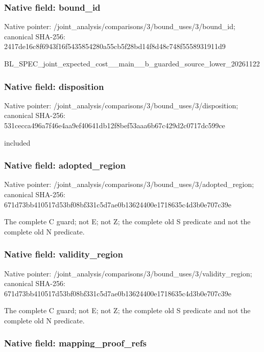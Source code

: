 \documentclass[10pt,a4paper]{article}
\begin{document}
\subsubsection{Native field: bound\_id}


Native pointer: /joint\_analysis/comparis\allowbreak{}ons/3/bound\_uses/3/bound\allowbreak{}\_id; canonical SHA-256: 2417de16c8f6943f16f54358\allowbreak{}54280a55cb5f28bd14f8d48c\allowbreak{}748f5558931911d9


BL\_SPEC\_joint\_expected\_c\allowbreak{}ost\_\_main\_\_b\_guarded\_sou\allowbreak{}rce\_lower\_20261122


\subsubsection{Native field: disposition}


Native pointer: /joint\_analysis/comparis\allowbreak{}ons/3/bound\_uses/3/dispo\allowbreak{}sition; canonical SHA-256: 531cecca496a7f46e4aa9ef4\allowbreak{}0641db12f8bef53aaa6b67c4\allowbreak{}29d2c0717dc599ce


included


\subsubsection{Native field: adopted\_region}


Native pointer: /joint\_analysis/comparis\allowbreak{}ons/3/bound\_uses/3/adopt\allowbreak{}ed\_region; canonical SHA-256: 671d73bb410517d53bf08bf3\allowbreak{}31c5d7ae0b13624400e17186\allowbreak{}35c4d3b0e707c39e


The complete C guard; not E; not Z; the complete old S predicate and not the complete old N predicate.


\subsubsection{Native field: validity\_region}


Native pointer: /joint\_analysis/comparis\allowbreak{}ons/3/bound\_uses/3/valid\allowbreak{}ity\_region; canonical SHA-256: 671d73bb410517d53bf08bf3\allowbreak{}31c5d7ae0b13624400e17186\allowbreak{}35c4d3b0e707c39e


The complete C guard; not E; not Z; the complete old S predicate and not the complete old N predicate.


\subsubsection{Native field: mapping\_proof\_refs}
\end{document}
